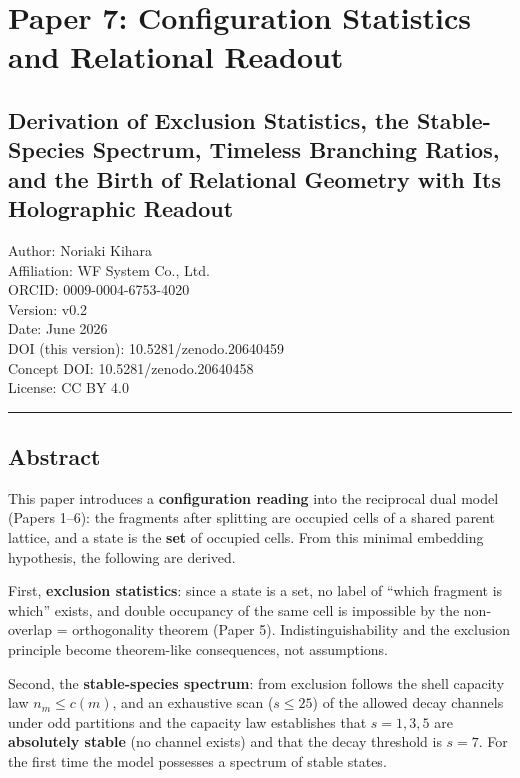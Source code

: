 \documentclass[
]{article}
\author{}
\date{}
\begin{document}
\section{Paper 7: Configuration Statistics and Relational
Readout}\label{paper-7-configuration-statistics-and-relational-readout}

\subsection{Derivation of Exclusion Statistics, the Stable-Species
Spectrum, Timeless Branching Ratios, and the Birth of Relational
Geometry with Its Holographic
Readout}\label{derivation-of-exclusion-statistics-the-stable-species-spectrum-timeless-branching-ratios-and-the-birth-of-relational-geometry-with-its-holographic-readout}

Author: Noriaki Kihara\\
Affiliation: WF System Co., Ltd.\\
ORCID: 0009-0004-6753-4020\\
Version: v0.2\\
Date: June 2026\\
DOI (this version): 10.5281/zenodo.20640459\\
Concept DOI: 10.5281/zenodo.20640458\\
License: CC BY 4.0

\begin{center}\rule{0.5\linewidth}{0.5pt}\end{center}

\subsection{Abstract}\label{abstract}

This paper introduces a \textbf{configuration reading} into the
reciprocal dual model (Papers 1--6): the fragments after splitting are
occupied cells of a shared parent lattice, and a state is the
\textbf{set} of occupied cells. From this minimal embedding hypothesis,
the following are derived.

First, \textbf{exclusion statistics}: since a state is a set, no label
of ``which fragment is which'' exists, and double occupancy of the same
cell is impossible by the non-overlap = orthogonality theorem (Paper 5).
Indistinguishability and the exclusion principle become theorem-like
consequences, not assumptions.

Second, the \textbf{stable-species spectrum}: from exclusion follows the
shell capacity law \(n_m\le c(m)\), and an exhaustive scan (\(s\le25\))
of the allowed decay channels under odd partitions and the capacity law
establishes that \(s=1,3,5\) are \textbf{absolutely stable} (no channel
exists) and that the decay threshold is \(s=7\). For the first time the
model possesses a spectrum of stable states.
\end{document}
